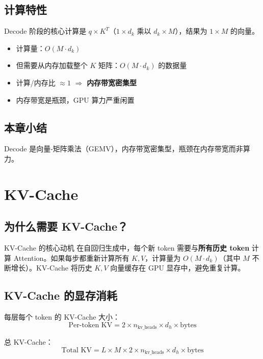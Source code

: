 \documentclass[a4paper]{article}
\begin{document}
\subsection{计算特性}

Decode 阶段的核心计算是 $q \times K^T$（$1 \times d_k$ 乘以 $d_k \times M$），结果为 $1 \times M$ 的向量。

\begin{itemize}
  \item 计算量：$O(M \cdot d_k)$
  \item 但需要从内存加载整个 $K$ 矩阵：$O(M \cdot d_k)$ 的数据量
  \item 计算/内存比 $\approx 1$ $\Rightarrow$ \textbf{内存带宽密集型}
  \item 内存带宽是瓶颈，GPU 算力严重闲置
\end{itemize}

\subsection{本章小结}

Decode 是向量-矩阵乘法（GEMV），内存带宽密集型，瓶颈在内存带宽而非算力。

\section{KV-Cache}

\subsection{为什么需要 KV-Cache？}

\begin{importantbox}{KV-Cache 的核心动机}
在自回归生成中，每个新 token 需要与\textbf{所有历史 token} 计算 Attention。如果每步都重新计算所有 $K, V$，计算量为 $O(M \cdot d_k)$（其中 $M$ 不断增长）。KV-Cache 将历史 $K, V$ 向量缓存在 GPU 显存中，避免重复计算。
\end{importantbox}

\subsection{KV-Cache 的显存消耗}

每层每个 token 的 KV-Cache 大小：
$$
\text{Per-token KV} = 2 \times n_{\text{kv\_heads}} \times d_h \times \text{bytes}
$$

总 KV-Cache：
$$
\text{Total KV} = L \times M \times 2 \times n_{\text{kv\_heads}} \times d_h \times \text{bytes}
$$
\end{document}

